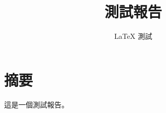 \documentclass{ctexart}
\title{測試報告}
\author{LaTeX 測試}
\begin{document}
\maketitle
\section{摘要}
這是一個測試報告。
\end{document}
